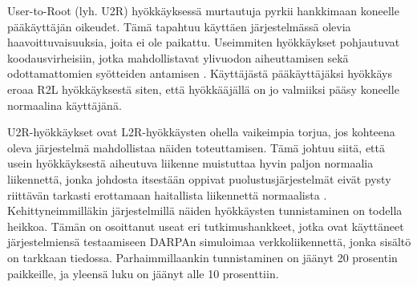User-to-Root (lyh. U2R) hyökkäyksessä murtautuja pyrkii hankkimaan
koneelle pääkäyttäjän oikeudet. Tämä tapahtuu käyttäen järjestelmässä
olevia haavoittuvaisuuksia, joita ei ole paikattu. Useimmiten
hyökkäykset pohjautuvat koodausvirheisiin, jotka mahdollistavat
ylivuodon aiheuttamisen sekä odottamattomien syötteiden antamisen
\cite{IDS}. Käyttäjästä pääkäyttäjäksi hyökkäys eroaa R2L hyökkäyksestä
siten, että hyökkääjällä on jo valmiiksi pääsy koneelle normaalina
käyttäjänä.

U2R-hyökkäykset ovat L2R-hyökkäysten ohella vaikeimpia torjua, jos kohteena
oleva järjestelmä mahdollistaa näiden toteuttamisen. Tämä johtuu siitä, että
usein hyökkäyksestä aiheutuva liikenne muistuttaa hyvin paljon normaalia
liikennettä, jonka johdosta itsestään oppivat puolustusjärjestelmät eivät pysty
riittävän tarkasti erottamaan haitallista liikennettä normaalista \cite{U2R}.
Kehittyneimmilläkin järjestelmillä näiden hyökkäysten tunnistaminen on todella
heikkoa. Tämän on osoittanut useat eri tutkimushankkeet, jotka ovat käyttäneet
järjestelmiensä testaamiseen DARPAn simuloimaa verkkoliikennettä, jonka sisältö
on tarkkaan tiedossa. Parhaimmillaankin tunnistaminen on jäänyt 20 prosentin
paikkeille, ja yleensä luku on jäänyt alle 10 prosenttiin.
